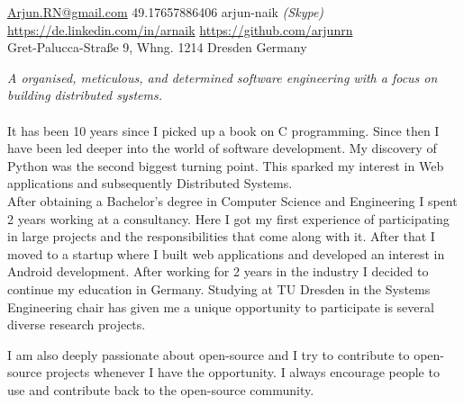 \documentclass[10pt,a4paper]{article}
\begin{document}
\sloppy  %


\nobreakvspace{0.3em}  %

\noindent\href{mailto:Arjun.RN@gmail.com}{Arjun.RN\mbox{}@\mbox{}gmail.com}\sbull
\textsmaller{+}49.17657886406
\sbull arjun-naik \emph{(Skype)}
\\
\sbull
\href{https://de.linkedin.com/in/arnaik}{https://de.linkedin.com/in/arnaik}
\sbull
\href{https://github.com/arjunrn}{https://github.com/arjunrn}
\\
Gret-Palucca-Stra{\ss}e 9, Whng. 1214\sbull
Dresden\sbull
Germany

\spacedhrule{0.9em}{-0.4em}  %


\vspace{-1.3em}  %
\begin{multicols}{2}  %
\noindent \emph{A organised, meticulous, and determined software engineering with a focus on building distributed systems.}
\\
\\
It has been 10 years since I picked up a book on C programming. Since then I have been led deeper into the world of software development. My discovery of Python was the second biggest turning point. This sparked my interest in Web applications and subsequently Distributed Systems. 
\\
After obtaining a Bachelor's degree in Computer Science and Engineering I spent 2 years working at a consultancy. Here I got my first experience of participating in large projects and the responsibilities that come along with it. After that I moved to a startup where I built web applications and developed an interest in Android development. After working for 2 years in the industry I decided to continue my education in Germany. Studying at TU Dresden in the Systems Engineering chair has given me a unique opportunity to participate is several diverse research projects.

I am also deeply passionate about open-source and I try to contribute to open-source projects whenever I have the opportunity. I always encourage people to use and contribute back to the open-source community.

\end{multicols}
\end{document}
